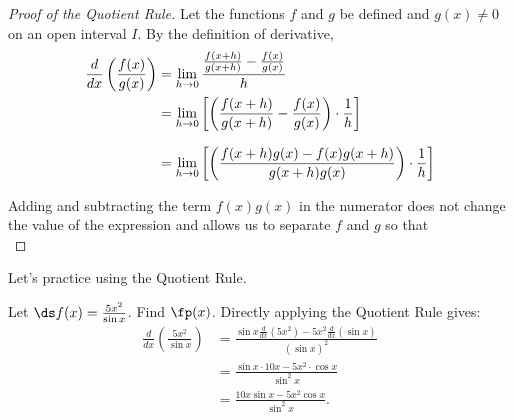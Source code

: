 \begin{proof}[Proof of the Quotient Rule]
Let the functions $f$ and $g$ be defined and $g(x) \neq 0$ on an open interval $I$. By the definition of derivative,
\begin{align*}
\frac{d}{dx}\left(\frac {f(x)}{g(x)}\right)
&=\lim_{h\to 0}\frac{\frac{f(x+h)}{g(x+h)}-\frac{f(x)}{g(x)}}{h} \\
&=\lim_{h\to 0}
\left[\left(\frac{f(x+h)}{g(x+h)}-\frac{f(x)}{g(x)}\right)\cdot\frac1h\right]\\[.5\baselineskip]
&=\lim_{h\to 0}
\left[\left(\frac{f(x+h)g(x)-f(x)g(x+h)}{g(x+h)g(x)}\right)\cdot\frac1h\right]
\end{align*}

Adding and subtracting the term $f(x)g(x)$ in the numerator does not change the value of the expression and allows us to separate $f$ and $g$ so that\\
\end{proof}

Let's practice using the Quotient Rule.

\begin{example}\label{ex_quot1}
Let $\ds f(x) = \frac{5x^2}{\sin x}$. Find $\fp(x)$.
\solution
Directly applying the Quotient Rule gives:
\begin{align*}
	\frac{d}{dx}\left(\frac{5x^2}{\sin x}\right)
	& = \frac{\sin x\frac{d}{dx}(5x^2)-5x^2\frac{d}{dx}(\sin x)}{(\sin x)^2} \\
	&= \frac{\sin x\cdot 10x - 5x^2\cdot \cos x}{\sin^2x} \\
	&= \frac{10x\sin x - 5x^2\cos x}{\sin^2 x}.
\end{align*}
\end{example}

